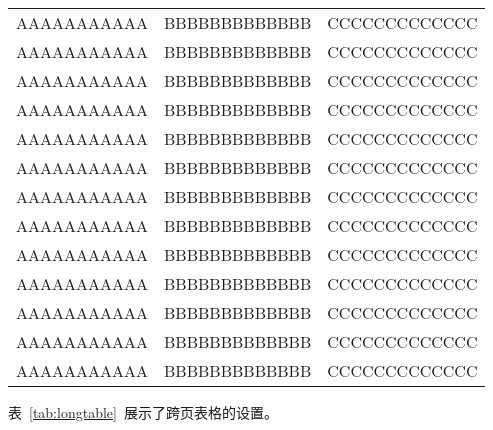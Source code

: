 \begin{longtable}{ccc}
  AAAAAAAAAAA & BBBBBBBBBBBBB & CCCCCCCCCCCCC \\
  AAAAAAAAAAA & BBBBBBBBBBBBB & CCCCCCCCCCCCC \\
  AAAAAAAAAAA & BBBBBBBBBBBBB & CCCCCCCCCCCCC \\
  AAAAAAAAAAA & BBBBBBBBBBBBB & CCCCCCCCCCCCC \\
  AAAAAAAAAAA & BBBBBBBBBBBBB & CCCCCCCCCCCCC \\
  AAAAAAAAAAA & BBBBBBBBBBBBB & CCCCCCCCCCCCC \\
  AAAAAAAAAAA & BBBBBBBBBBBBB & CCCCCCCCCCCCC \\
  AAAAAAAAAAA & BBBBBBBBBBBBB & CCCCCCCCCCCCC \\
  AAAAAAAAAAA & BBBBBBBBBBBBB & CCCCCCCCCCCCC \\
  AAAAAAAAAAA & BBBBBBBBBBBBB & CCCCCCCCCCCCC \\
  AAAAAAAAAAA & BBBBBBBBBBBBB & CCCCCCCCCCCCC \\
  AAAAAAAAAAA & BBBBBBBBBBBBB & CCCCCCCCCCCCC \\
  AAAAAAAAAAA & BBBBBBBBBBBBB & CCCCCCCCCCCCC \\

\end{longtable}

表~\ref{tab:longtable}~展示了跨页表格的设置。
